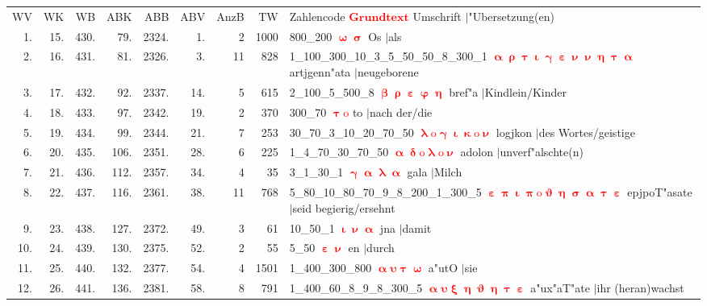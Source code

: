 \documentclass[a4paper,10pt,landscape]{article}
\begin{document}
\begin{tabular}{rrrrrrrrp{120mm}}
WV&WK&WB&ABK&ABB&ABV&AnzB&TW&Zahlencode \textcolor{red}{$\boldsymbol{Grundtext}$} Umschrift $|$"Ubersetzung(en)\\
1.&15.&430.&79.&2324.&1.&2&1000&800\_200 \textcolor{red}{$\boldsymbol{\upomega\upsigma}$} Os $|$als\\
2.&16.&431.&81.&2326.&3.&11&828&1\_100\_300\_10\_3\_5\_50\_50\_8\_300\_1 \textcolor{red}{$\boldsymbol{\upalpha\uprho\uptau\upiota\upgamma\upepsilon\upnu\upnu\upeta\uptau\upalpha}$} artjgenn"ata $|$neugeborene\\
3.&17.&432.&92.&2337.&14.&5&615&2\_100\_5\_500\_8 \textcolor{red}{$\boldsymbol{\upbeta\uprho\upepsilon\upvarphi\upeta}$} bref"a $|$Kindlein/Kinder\\
4.&18.&433.&97.&2342.&19.&2&370&300\_70 \textcolor{red}{$\boldsymbol{\uptau\mathrm{o}}$} to $|$nach der/die\\
5.&19.&434.&99.&2344.&21.&7&253&30\_70\_3\_10\_20\_70\_50 \textcolor{red}{$\boldsymbol{\uplambda\mathrm{o}\upgamma\upiota\upkappa\mathrm{o}\upnu}$} logjkon $|$des Wortes/geistige\\
6.&20.&435.&106.&2351.&28.&6&225&1\_4\_70\_30\_70\_50 \textcolor{red}{$\boldsymbol{\upalpha\updelta\mathrm{o}\uplambda\mathrm{o}\upnu}$} adolon $|$unverf"alschte(n)\\
7.&21.&436.&112.&2357.&34.&4&35&3\_1\_30\_1 \textcolor{red}{$\boldsymbol{\upgamma\upalpha\uplambda\upalpha}$} gala $|$Milch\\
8.&22.&437.&116.&2361.&38.&11&768&5\_80\_10\_80\_70\_9\_8\_200\_1\_300\_5 \textcolor{red}{$\boldsymbol{\upepsilon\uppi\upiota\uppi\mathrm{o}\upvartheta\upeta\upsigma\upalpha\uptau\upepsilon}$} epjpoT"asate $|$seid begierig/ersehnt\\
9.&23.&438.&127.&2372.&49.&3&61&10\_50\_1 \textcolor{red}{$\boldsymbol{\upiota\upnu\upalpha}$} jna $|$damit\\
10.&24.&439.&130.&2375.&52.&2&55&5\_50 \textcolor{red}{$\boldsymbol{\upepsilon\upnu}$} en $|$durch\\
11.&25.&440.&132.&2377.&54.&4&1501&1\_400\_300\_800 \textcolor{red}{$\boldsymbol{\upalpha\upsilon\uptau\upomega}$} a"utO $|$sie\\
12.&26.&441.&136.&2381.&58.&8&791&1\_400\_60\_8\_9\_8\_300\_5 \textcolor{red}{$\boldsymbol{\upalpha\upsilon\upxi\upeta\upvartheta\upeta\uptau\upepsilon}$} a"ux"aT"ate $|$ihr (heran)wachst\\
\end{tabular}\medskip \\
\end{document}

